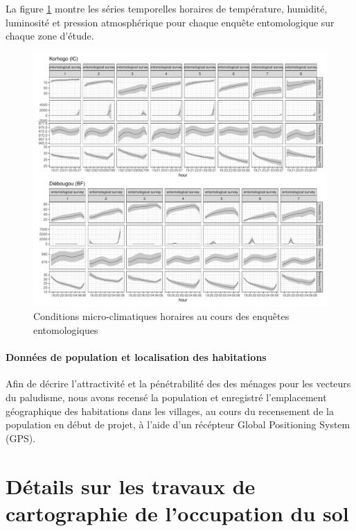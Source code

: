 \documentclass[12pt,twoside]{reedthesis}
\begin{document}
La figure \ref{fig:plot-microclimate} montre les séries temporelles horaires de température, humidité, luminosité et pression atmosphérique pour chaque enquête entomologique sur chaque zone d'étude.
\begin{figure}

{\centering \includegraphics[width=1\linewidth]{figure/microclimate} 

}

\caption[Conditions micro-climatiques horaires au cours des enquêtes entomologiques]{Conditions micro-climatiques horaires au cours des enquêtes entomologiques}\label{fig:plot-microclimate}
\end{figure}
\hypertarget{pop-data}{%
\subsubsection{Données de population et localisation des habitations}\label{pop-data}}

Afin de décrire l'attractivité et la pénétrabilité des des ménages pour les vecteurs du paludisme, nous avons recensé la population et enregistré l'emplacement géographique des habitations dans les villages, au cours du recensement de la population en début de projet, à l'aide d'un récépteur Global Positioning System (GPS).

\hypertarget{annex-landcover}{%
\chapter{Détails sur les travaux de cartographie de l'occupation du sol}\label{annex-landcover}}
\end{document}

